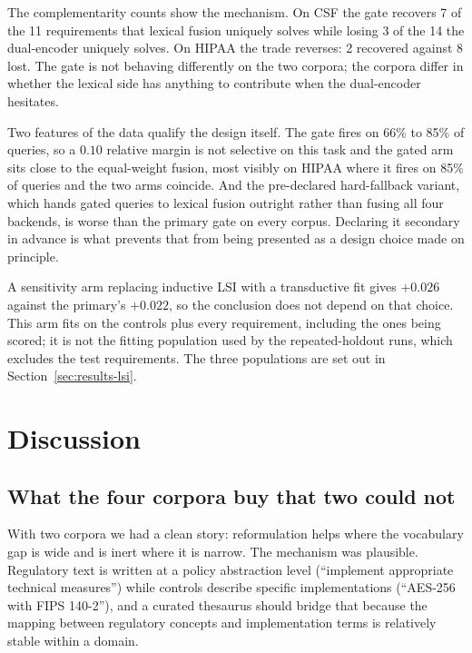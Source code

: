 \documentclass[smallextended,natbib]{svjour3}
\begin{document}
The complementarity counts show the mechanism. On CSF the gate recovers 7 of the 11 requirements that lexical fusion uniquely solves while losing 3 of the 14 the dual-encoder uniquely solves. On HIPAA the trade reverses: 2 recovered against 8 lost. The gate is not behaving differently on the two corpora; the corpora differ in whether the lexical side has anything to contribute when the dual-encoder hesitates.

Two features of the data qualify the design itself. The gate fires on 66\% to 85\% of queries, so a $0.10$ relative margin is not selective on this task and the gated arm sits close to the equal-weight fusion, most visibly on HIPAA where it fires on 85\% of queries and the two arms coincide. And the pre-declared hard-fallback variant, which hands gated queries to lexical fusion outright rather than fusing all four backends, is worse than the primary gate on every corpus. Declaring it secondary in advance is what prevents that from being presented as a design choice made on principle.

A sensitivity arm replacing inductive LSI with a transductive fit gives $+0.026$ against the primary's $+0.022$, so the conclusion does not depend on that choice. This arm fits on the controls plus every requirement, including the ones being scored; it is not the fitting population used by the repeated-holdout runs, which excludes the test requirements. The three populations are set out in Section~\ref{sec:results-lsi}.

\section{Discussion}
\label{sec:discussion}

\subsection{What the four corpora buy that two could not}

With two corpora we had a clean story: reformulation helps where the vocabulary gap is wide and is inert where it is narrow. The mechanism was plausible. Regulatory text is written at a policy abstraction level (``implement appropriate technical measures'') while controls describe specific implementations (``AES-256 with FIPS 140-2''), and a curated thesaurus should bridge that because the mapping between regulatory concepts and implementation terms is relatively stable within a domain.
\end{document}
